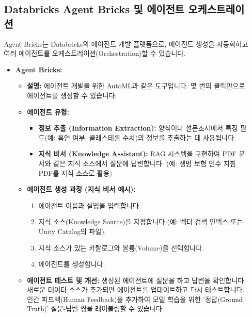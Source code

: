 \documentclass[11pt,a4paper]{article}
\theoremstyle{definition}
\begin{document}
\subsection{Databricks Agent Bricks 및 에이전트 오케스트레이션}

Agent Bricks는 Databricks의 에이전트 개발 플랫폼으로, 에이전트 생성을 자동화하고 여러 에이전트를 오케스트레이션(Orchestration)할 수 있습니다.

\begin{itemize}
    \item \textbf{Agent Bricks:}
    \begin{itemize}
        \item \textbf{설명:} 에이전트 개발을 위한 AutoML과 같은 도구입니다. 몇 번의 클릭만으로 에이전트를 생성할 수 있습니다.
        \item \textbf{에이전트 유형:}
        \begin{itemize}
            \item \textbf{정보 추출 (Information Extraction):} 양식이나 설문조사에서 특정 필드(예: 흡연 여부, 콜레스테롤 수치)의 정보를 추출하는 데 사용됩니다.
            \item \textbf{지식 비서 (Knowledge Assistant):} RAG 시스템을 구현하여 PDF 문서와 같은 지식 소스에서 질문에 답변합니다. (예: 생명 보험 인수 지침 PDF를 지식 소스로 활용)
        \end{itemize}
        \item \textbf{에이전트 생성 과정 (지식 비서 예시):}
        \begin{enumerate}
            \item 에이전트 이름과 설명을 입력합니다.
            \item 지식 소스(Knowledge Source)를 지정합니다 (예: 벡터 검색 인덱스 또는 Unity Catalog의 파일).
            \item 지식 소스가 있는 카탈로그와 볼륨(Volume)을 선택합니다.
            \item 에이전트를 생성합니다.
        \end{enumerate}
        \item \textbf{에이전트 테스트 및 개선:} 생성된 에이전트에 질문을 하고 답변을 확인합니다. 새로운 데이터 소스가 추가되면 에이전트를 업데이트하고 다시 테스트합니다. 인간 피드백(Human Feedback)을 추가하여 모델 학습을 위한 '정답(Ground Truth)' 질문-답변 쌍을 레이블링할 수 있습니다.
    \end{itemize}


\end{itemize}
\end{document}
